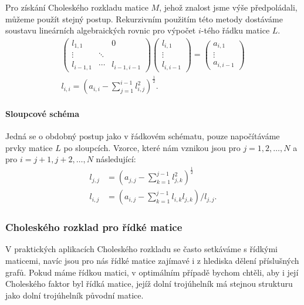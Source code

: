 \documentclass[11pt,american,czech,oneside]{book}
\theoremstyle{plain}
\theoremstyle{definition}
\begin{document}
Pro získání Choleského rozkladu matice $M$, jehož znalost jsme výše předpoládali, můžeme použít stejný postup. Rekurzivním použitím této metody dostáváme soustavu lineárních algebraických rovnic pro výpočet $i$-tého řádku matice $L$.
\begin{gather*}
\begin{pmatrix}
  l_{1,1} &  & 0 \\
  \vdots  & \ddots &  \\
  l_{i-1,1} & \cdots & l_{i-1,i-1}
\end{pmatrix}
\begin{pmatrix}
  l_{i,1} \\
  \vdots \\
  l_{i,i-1}
\end{pmatrix}
=
\begin{pmatrix}
  a_{i,1} \\
  \vdots \\
  a_{i,i-1}
\end{pmatrix} \\
 l_{i,i} = \left(a_{i,i} - \sum_{j=1}^{i-1}{l_{i,j}^2}\right)^\frac12.
\end{gather*}

\paragraph{Sloupcové schéma}
Jedná se o obdobný postup jako v řádkovém schématu, pouze napočítáváme prvky matice $L$ po sloupcích. Vzorce, které nám vznikou jsou pro $j = 1,2,\ldots, N$ a pro $i = j+1,j+2,\ldots,N$ následující:
\begin{align*}
  l_{j,j} &= \left(a_{j,j} - \sum_{k=1}^{j-1}{l_{j,k}^2}\right)^\frac12 \\
  l_{i,j} &= \left(a_{i,j} - \sum_{k=1}^{j-1}{l_{i,k}l_{j,k}}\right)/l_{j,j}.
\end{align*}

\subsubsection{Choleského rozklad pro řídké matice}
\label{Choleskysparse}

V praktických aplikacích Choleského rozkladu se často setkáváme s řídkými maticemi, navíc jsou pro nás řídké matice zajímavé i z hlediska dělení příslušných grafů. Pokud máme řídkou matici, v optimálním případě bychom chtěli, aby i její Choleského faktor byl řídká matice, jejíž dolní trojúhelník má stejnou strukturu jako dolní trojúhelník původní matice.
\end{document}
